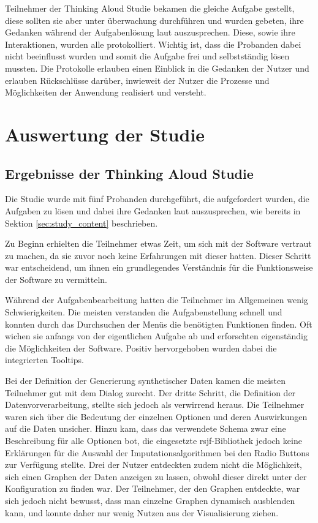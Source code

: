 Teilnehmer der Thinking Aloud Studie bekamen die gleiche Aufgabe gestellt, diese sollten sie aber unter überwachung durchführen und wurden gebeten, ihre Gedanken während der Aufgabenlösung laut auszusprechen. Diese, sowie ihre Interaktionen, wurden alle protokolliert.
Wichtig ist, dass die Probanden dabei nicht beeinflusst wurden und somit die Aufgabe frei und selbstständig lösen mussten.
Die Protokolle erlauben einen Einblick in die Gedanken der Nutzer und erlauben Rückschlüsse darüber, inwieweit der Nutzer die Prozesse und Möglichkeiten der Anwendung realisiert und versteht.



\section{Auswertung der Studie}
\subsection{Ergebnisse der Thinking Aloud Studie}
Die Studie wurde mit fünf Probanden durchgeführt, die aufgefordert wurden, die Aufgaben zu lösen und dabei ihre Gedanken laut auszusprechen, wie bereits in Sektion \ref*{sec:study_content} beschrieben.

Zu Beginn erhielten die Teilnehmer etwas Zeit, um sich mit der Software vertraut zu machen, da sie zuvor noch keine Erfahrungen mit dieser hatten. Dieser Schritt war entscheidend, um ihnen ein grundlegendes 
Verständnis für die Funktionsweise der Software zu vermitteln.

Während der Aufgabenbearbeitung hatten die Teilnehmer im Allgemeinen wenig Schwierigkeiten. Die meisten verstanden die Aufgabenstellung schnell und konnten durch das Durchsuchen der Menüs die benötigten Funktionen finden. 
Oft wichen sie anfangs von der eigentlichen Aufgabe ab und erforschten eigenständig die Möglichkeiten der Software. Positiv hervorgehoben wurden dabei die integrierten Tooltips.

Bei der Definition der Generierung synthetischer Daten kamen die meisten Teilnehmer gut mit dem Dialog zurecht. Der dritte Schritt, die Definition der Datenvorverarbeitung, stellte sich jedoch als verwirrend heraus. 
Die Teilnehmer waren sich über die Bedeutung der einzelnen Optionen und deren Auswirkungen auf die Daten unsicher. Hinzu kam, dass das verwendete Schema zwar eine Beschreibung für alle Optionen bot, die eingesetzte rsjf-Bibliothek jedoch 
keine Erklärungen für die Auswahl der Imputationsalgorithmen bei den Radio Buttons zur Verfügung stellte. Drei der Nutzer entdeckten zudem nicht die Möglichkeit, sich einen Graphen der Daten anzeigen zu lassen, obwohl dieser 
direkt unter der Konfiguration zu finden war. Der Teilnehmer, der den Graphen entdeckte, war sich jedoch nicht bewusst, dass man einzelne Graphen dynamisch ausblenden kann, und konnte daher nur wenig Nutzen aus der Visualisierung ziehen.


